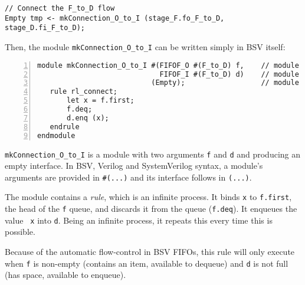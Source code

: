 \begin{tabbing}
\hmm\small\tt   // Connect the F\_to\_D flow \\
\hmm\small\tt   Empty tmp <- mkConnection\_O\_to\_I (stage\_F.fo\_F\_to\_D, stage\_D.fi\_F\_to\_D);
\end{tabbing}

Then, the module {\tt mkConnection\_O\_to\_I} can be written simply in BSV itself:

{\small
\begin{Verbatim}[frame=single, numbers=left]
module mkConnection_O_to_I #(FIFOF_O #(F_to_D) f,    // module argument
                             FIFOF_I #(F_to_D) d)    // module argument
                           (Empty);                  // module interface
   rule rl_connect;
       let x = f.first;
       f.deq;
       d.enq (x);
   endrule
endmodule
\end{Verbatim}
}

{\tt mkConnection\_O\_to\_I} is a module with two arguments {\tt f} and {\tt d}
and producing an empty interface.  In BSV, Verilog and SystemVerilog
syntax, a module's arguments are provided in {\tt \#(...)} and its
interface follows in {\tt (...)}.


The module contains a \emph{rule}, which is an infinite process.  It
binds {\tt x} to {\tt f.first}, the head of the {\tt f} queue, and
discards it from the queue ({\tt f.deq}).  It enqueues the value {\tt
x} into {\tt d}.  Being an infinite process, it repeats this every
time this is possible.

Because of the automatic flow-control in BSV FIFOs, this rule will
only execute when {\tt f} is non-empty (contains an item, available to
dequeue) and {\tt d} is not full (has space, available to enqueue).

\vspace{2ex}



